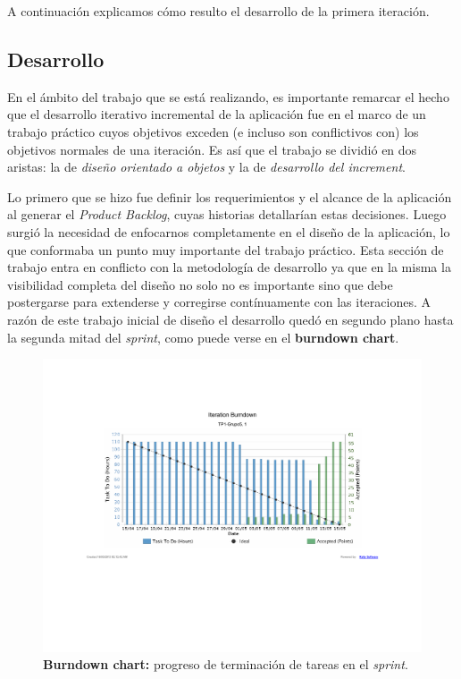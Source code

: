 \documentclass[10pt, a4paper]{article}
\begin{document}
A continuación explicamos cómo resulto el desarrollo de la primera iteración.

\subsection{Desarrollo}

En el ámbito del trabajo que se está realizando, es importante remarcar el hecho que el desarrollo iterativo incremental de la aplicación fue en el marco de un trabajo práctico cuyos objetivos exceden (e incluso son conflictivos con) los objetivos normales de una iteración. Es así que el trabajo se dividió en dos aristas: la de \emph{diseño orientado a objetos} y la de \emph{desarrollo del increment}. 

Lo primero que se hizo fue definir los requerimientos y el alcance de la aplicación al generar el \emph{Product Backlog}, cuyas historias detallarían estas decisiones. Luego surgió la necesidad de enfocarnos completamente en el diseño de la aplicación, lo que conformaba un punto muy importante del trabajo práctico. Esta sección de trabajo entra en conflicto con la metodología de desarrollo ya que en la misma la visibilidad completa del diseño no solo no es importante sino que debe postergarse para extenderse y corregirse contínuamente con las iteraciones. A razón de este trabajo inicial de diseño el desarrollo quedó en segundo plano hasta la segunda mitad del \emph{sprint}, como puede verse en el \textbf{burndown chart}.

\begin{figure}[H]
\centering
\includegraphics[width=\textwidth]{graphics/iteration_burndown.pdf}
\caption{\textbf{Burndown chart:} progreso de terminación de tareas en el \emph{sprint}.}
\end{figure}
\end{document}
